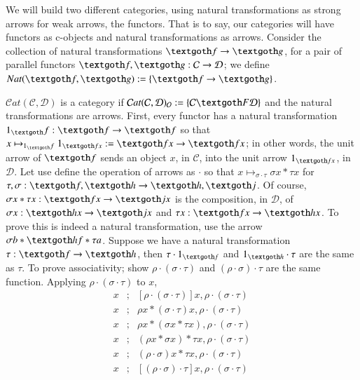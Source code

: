 \documentclass [12pt]{book}
\begin{document}
We will build two different categories, using natural transformations as strong arrows for weak arrows, the functors. That is to say, our categories will have functors as c-objects and natural transformations as arrows. Consider the collection of natural transformations $\textgoth f\rightarrow\textgoth g$, for a pair of parallel functors $\textgoth f,\textgoth g:\mathcal C\rightarrow\mathcal D$; we define $Nat(\textgoth f,\textgoth g):=\{\textgoth f\rightarrow\textgoth g\}$. 

$\mathcal Cat(\mathcal C,\mathcal D)$ is a category if $\mathcal Cat(\mathcal C,\mathcal D)_\mathcal O:=\{\mathcal C\textgoth F\mathcal D\}$ and the natural transformations are arrows. First, every functor has a natural transformation $1_\textgoth f:\textgoth f\rightarrow\textgoth f$ so that $x\mapsto_{1_\textgoth f}1_{\textgoth fx}:=\textgoth fx\rightarrow\textgoth fx$; in other words, the unit arrow of $\textgoth f$ sends an object $x$, in $\mathcal C$, into the unit arrow $1_{\textgoth fx}$, in $\mathcal D$. Let use define the operation of arrows as $\cdot$ so that $x\mapsto_{\sigma\cdot\tau}\sigma x*\tau x$ for $\tau,\sigma:\textgoth f,\textgoth h\rightarrow\textgoth h,\textgoth j$. Of course, $\sigma x*\tau x:\textgoth fx\rightarrow\textgoth jx$ is the composition, in $\mathcal D$, of $\sigma x:\textgoth hx\rightarrow\textgoth jx$ and $\tau x:\textgoth fx\rightarrow\textgoth hx$. To prove this is indeed a natural transformation, use the arrow $\sigma b*\textgoth hf*\tau a$. Suppose we have a natural transformation $\tau:\textgoth f\rightarrow\textgoth h$, then $\tau\cdot1_{\textgoth f}$ and $1_{\textgoth h}\cdot\tau$ are the same as $\tau$. To prove associativity; show $\rho\cdot(\sigma\cdot\tau)$ and $(\rho\cdot\sigma)\cdot\tau$ are the same function. Applying $\rho\cdot(\sigma\cdot\tau)$ to $x$, \begin{eqnarray}\nonumber x&;&[\rho\cdot(\sigma\cdot\tau)]x,\rho\cdot(\sigma\cdot\tau)\\\nonumber x&;&\rho x*(\sigma\cdot\tau)x,\rho\cdot(\sigma\cdot\tau)\\\nonumber x&;&\rho x*(\sigma x*\tau x),\rho\cdot(\sigma\cdot\tau)\\\nonumber x&;&(\rho x*\sigma x)*\tau x,\rho\cdot(\sigma\cdot\tau)\\\nonumber x&;&(\rho\cdot\sigma)x*\tau x,\rho\cdot(\sigma\cdot\tau)\\\nonumber x&;&[(\rho\cdot\sigma)\cdot\tau]x,\rho\cdot(\sigma\cdot\tau)\end{eqnarray}
\end{document}
